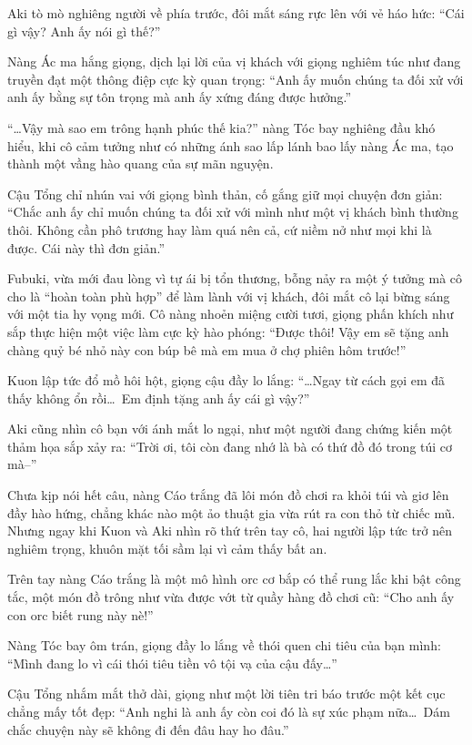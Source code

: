 \documentclass[../main.tex]{subfiles}
\begin{document}
Aki tò mò nghiêng người về phía trước, đôi mắt sáng rực lên với vẻ háo hức: ``Cái gì vậy? Anh ấy nói gì thế?''

Nàng Ác ma hắng giọng, dịch lại lời của vị khách với giọng nghiêm túc như đang truyền đạt một thông điệp cực kỳ quan trọng: ``Anh ấy muốn chúng ta đối xử với anh ấy bằng sự tôn trọng mà anh ấy xứng đáng được hưởng.''

``\dots Vậy mà sao em trông hạnh phúc thế kia?'' nàng Tóc bay nghiêng đầu khó hiểu, khi cô cảm tưởng như có những ánh sao lấp lánh bao lấy nàng Ác ma, tạo thành một vầng hào quang của sự mãn nguyện.

Cậu Tổng chỉ nhún vai với giọng bình thản, cố gắng giữ mọi chuyện đơn giản: ``Chắc anh ấy chỉ muốn chúng ta đối xử với mình như một vị khách bình thường thôi. Không cần phô trương hay làm quá nên cả, cứ niềm nở như mọi khi là được. Cái này thì đơn giản.''

Fubuki, vừa mới đau lòng vì tự ái bị tổn thương, bỗng nảy ra một ý tưởng mà cô cho là ``hoàn toàn phù hợp'' để làm lành với vị khách, đôi mắt cô lại bừng sáng với một tia hy vọng mới. Cô nàng nhoẻn miệng cười tươi, giọng phấn khích như sắp thực hiện một việc làm cực kỳ hào phóng: ``Được thôi! Vậy em sẽ tặng anh chàng quỷ bé nhỏ này con búp bê mà em mua ở chợ phiên hôm trước!''

Kuon lập tức đổ mồ hôi hột, giọng cậu đầy lo lắng: ``\dots Ngay từ cách gọi em đã thấy không ổn rồi\dots\ Em định tặng anh ấy cái gì vậy?''

Aki cũng nhìn cô bạn với ánh mắt lo ngại, như một người đang chứng kiến một thảm họa sắp xảy ra: ``Trời ơi, tôi còn đang nhớ là bà có thứ đồ đó trong túi cơ mà--''

Chưa kịp nói hết câu, nàng Cáo trắng đã lôi món đồ chơi ra khỏi túi và giơ lên đầy hào hứng, chẳng khác nào một ảo thuật gia vừa rút ra con thỏ từ chiếc mũ. Nhưng ngay khi Kuon và Aki nhìn rõ thứ trên tay cô, hai người lập tức trở nên nghiêm trọng, khuôn mặt tối sầm lại vì cảm thấy bất an.

Trên tay nàng Cáo trắng là một mô hình orc cơ bắp có thể rung lắc khi bật công tắc, một món đồ trông như vừa được vớt từ quầy hàng đồ chơi cũ: ``Cho anh ấy con orc biết rung này nè!''


Nàng Tóc bay ôm trán, giọng đầy lo lắng về thói quen chi tiêu của bạn mình: ``Mình đang lo vì cái thói tiêu tiền vô tội vạ của cậu đấy\dots''

Cậu Tổng nhắm mắt thở dài, giọng như một lời tiên tri báo trước một kết cục chẳng mấy tốt đẹp: ``Anh nghi là anh ấy còn coi đó là sự xúc phạm nữa\dots\ Dám chắc chuyện này sẽ không đi đến đâu hay ho đâu.''
\end{document}
